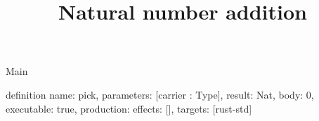 \begin{lexlean}{Main}
\title{Natural number addition}
\begin{semanticmodule}
definition{
  name: pick,
  parameters: [carrier : Type],
  result: Nat,
  body: 0,
  executable: true,
  production: {effects: [], targets: [rust-std]}
}
\end{semanticmodule}
\end{lexlean}
